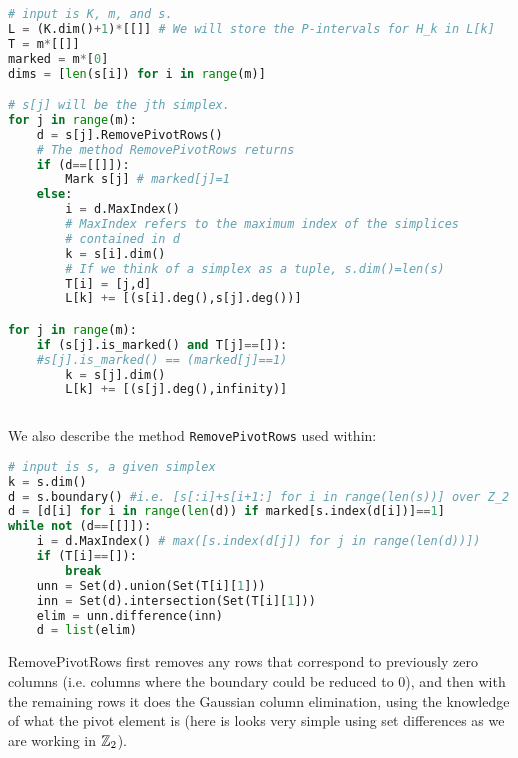 \documentclass{article}
\begin{document}
\begin{lstlisting}[language=Python,frame=single]
# input is K, m, and s. 
L = (K.dim()+1)*[[]] # We will store the P-intervals for H_k in L[k]
T = m*[[]]
marked = m*[0]
dims = [len(s[i]) for i in range(m)]

# s[j] will be the jth simplex. 
for j in range(m):
	d = s[j].RemovePivotRows()
	# The method RemovePivotRows returns 
	if (d==[[]]):
		Mark s[j] # marked[j]=1
	else:
		i = d.MaxIndex()
		# MaxIndex refers to the maximum index of the simplices 
		# contained in d
		k = s[i].dim()
		# If we think of a simplex as a tuple, s.dim()=len(s)
		T[i] = [j,d]
		L[k] += [(s[i].deg(),s[j].deg())]

for j in range(m):
	if (s[j].is_marked() and T[j]==[]): 
	#s[j].is_marked() == (marked[j]==1)
		k = s[j].dim()
		L[k] += [(s[j].deg(),infinity)]
	
\end{lstlisting}
We also describe the method \texttt{RemovePivotRows} used within:
\begin{lstlisting}[language=Python,frame=single]
# input is s, a given simplex
k = s.dim()
d = s.boundary() #i.e. [s[:i]+s[i+1:] for i in range(len(s))] over Z_2
d = [d[i] for i in range(len(d)) if marked[s.index(d[i])]==1]
while not (d==[[]]):
	i = d.MaxIndex() # max([s.index(d[j]) for j in range(len(d))])
	if (T[i]==[]):
		break
	unn = Set(d).union(Set(T[i][1]))
	inn = Set(d).intersection(Set(T[i][1]))
	elim = unn.difference(inn)
	d = list(elim)
\end{lstlisting}
RemovePivotRows first removes any rows that correspond to previously zero columns (i.e. columns where the boundary could be reduced to $0$), and then with the remaining rows it does the Gaussian column elimination, using the knowledge of what the pivot element is (here is looks very simple using set differences as we are working in $\mathbb{Z}_2$).
\end{document}
